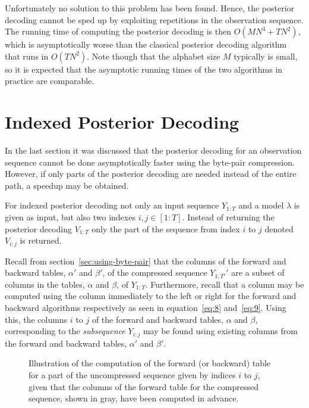 Unfortunately no solution to this problem has been found. Hence, the posterior
decoding cannot be sped up by exploiting repetitions in the observation
sequence. The running time of computing the posterior decoding is then
$O(M N^3 + TN^2)$, which is asymptotically worse than the classical posterior
decoding algorithm that runs in $O(TN^2)$. Note though that the alphabet size
$M$ typically is small, so it is expected that the asymptotic running times of
the two algorithms in practice are comparable.

\section{Indexed Posterior Decoding}

In the last section it was discussed that the posterior decoding for an
observation sequence cannot be done asymptotically faster using the byte-pair
compression. However, if only parts of the posterior decoding are needed
instead of the entire path, a speedup may be obtained.

For indexed posterior decoding not only an input sequence $Y_{1:T}$ and a model
$\lambda$ is given as input, but also two indexes $i,j \in [1:T]$. Instead of
returning the posterior decoding $V_{1:T}$ only the part of the sequence
from index $i$ to $j$ denoted $V_{i:j}$ is returned.

Recall from section~\ref{sec:using-byte-pair} that the columns of the forward
and backward tables, $\alpha'$ and $\beta'$, of the compressed sequence
$Y_{1:T'}'$ are a subset of columns in the tables, $\alpha$ and $\beta$, of
$Y_{1:T}$. Furthermore, recall that a column may be computed using the column
immediately to the left or right for the forward and backward algorithms
respectively as seen in equation~\eqref{eq:8} and~\eqref{eq:9}. Using this, the
columns $i$ to $j$ of the forward and backward tables, $\alpha$ and $\beta$,
corresponding to the \emph{subsequence} $Y_{i:j}$ may be found using existing
columns from the forward and backward tables, $\alpha'$ and $\beta'$.

\begin{figure}
  \centering
  
  \caption{Illustration of the computation of the forward (or backward) table
    for a part of the uncompressed sequence given by indices $i$ to $j$,
    given that the columns of the forward table for the compressed sequence,
    shown in gray, have been computed in advance.}
  \label{fig:subsequence-posterior}
\end{figure}

